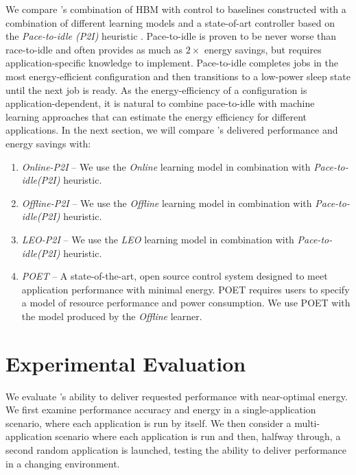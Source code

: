 We compare \SYSTEM{}'s combination of HBM with control to baselines
constructed with a combination of different learning models and a
state-of-art controller based on the \emph{Pace-to-idle (P2I)}
heuristic \cite{kim-cpsna}.  Pace-to-idle is proven to be never worse
than race-to-idle and often provides as much as $2\times$ energy
savings, but requires application-specific knowledge to implement.
Pace-to-idle completes jobs in the most energy-efficient configuration
and then transitions to a low-power sleep state until the next job is
ready.  As the energy-efficiency of a configuration is
application-dependent, it is natural to combine pace-to-idle with
machine learning approaches that can estimate the energy efficiency
for different applications.  In the next section, we will compare
\SYSTEM{}'s delivered performance and energy savings with:
\begin{enumerate}
\item \textit{Online-P2I} -- We use the \textit{Online} learning model
  in combination with \emph{Pace-to-idle(P2I)} heuristic.
\item \textit{Offline-P2I} -- We use the \textit{Offline} learning
  model in combination with \emph{Pace-to-idle(P2I)} heuristic.
\item \textit{LEO-P2I} -- We use the \textit{LEO} learning model in
  combination with \emph{Pace-to-idle(P2I)} heuristic.
\item \textit{POET} -- A state-of-the-art, open source control system
  designed to meet application performance with minimal energy.  POET
  requires users to specify a model of resource performance and power
  consumption.  We use POET with the model produced by the
  \emph{Offline} learner.
\end{enumerate}

\section{Experimental Evaluation}
We evaluate \SYSTEM{}'s ability to deliver requested performance with
near-optimal energy.  We first examine performance accuracy and energy
in a single-application scenario, where each application is run by
itself.  We then consider a multi-application scenario where each
application is run and then, halfway through, a second random
application is launched, testing the ability to deliver performance in
a changing environment.  

